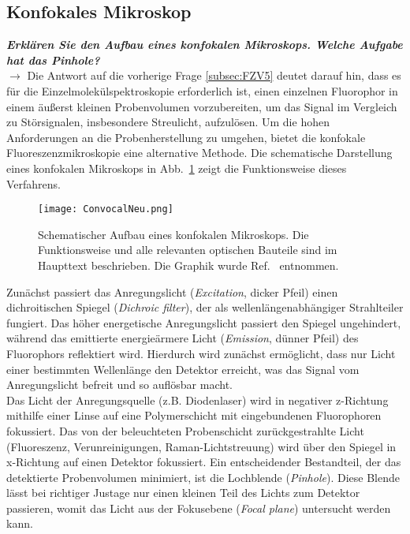 \subsection{\label{subsec:FZV6}Konfokales Mikroskop}
\textbf{\textit{Erklären Sie den Aufbau eines konfokalen Mikroskops. Welche Aufgabe hat das Pinhole?}} \\
$\rightarrow$
Die Antwort auf die vorherige Frage \ref{subsec:FZV5} deutet darauf hin, dass es für die Einzelmolekülspektroskopie 
erforderlich ist, einen einzelnen Fluorophor in einem äußerst kleinen Probenvolumen vorzubereiten, 
um das Signal im Vergleich zu Störsignalen, insbesondere Streulicht, aufzulösen. 
Um die hohen Anforderungen an die Probenherstellung zu umgehen, bietet die konfokale Fluoreszenzmikroskopie 
eine alternative Methode. Die schematische Darstellung eines konfokalen Mikroskops 
in Abb.~\ref{fig:convocal} zeigt die Funktionsweise dieses Verfahrens.
\begin{figure}[h!]
    \centering
    \texttt{[image: ConvocalNeu.png]}
    \caption{\label{fig:convocal}Schematischer Aufbau eines konfokalen Mikroskops.
    Die Funktionsweise und alle relevanten optischen Bauteile sind im Haupttext beschrieben.
    Die Graphik wurde Ref.~\cite{Prinzip} entnommen.}
\end{figure}\FloatBarrier
Zunächst passiert das Anregungslicht (\textit{Excitation}, dicker Pfeil) einen dichroitischen Spiegel 
(\textit{Dichroic filter}), der als wellenlängenabhängiger Strahlteiler fungiert. 
Das höher energetische Anregungslicht passiert den Spiegel ungehindert, während das emittierte 
energieärmere Licht (\textit{Emission}, dünner Pfeil) des Fluorophors reflektiert wird. 
Hierdurch wird zunächst ermöglicht, dass nur Licht einer bestimmten Wellenlänge den Detektor 
erreicht, was das Signal vom Anregungslicht befreit und so auflösbar macht. \\
Das Licht der Anregungsquelle (z.B. Diodenlaser) wird in negativer z-Richtung mithilfe einer Linse 
auf eine Polymerschicht mit eingebundenen Fluorophoren fokussiert. Das von der beleuchteten 
Probenschicht zurückgestrahlte Licht (Fluoreszenz, Verunreinigungen, Raman-Lichtstreuung) wird 
über den Spiegel in x-Richtung auf einen Detektor fokussiert. Ein entscheidender Bestandteil, 
der das detektierte Probenvolumen minimiert, ist die Lochblende (\textit{Pinhole}). 
Diese Blende lässt bei richtiger Justage nur einen kleinen Teil des Lichts zum Detektor passieren, 
womit das Licht aus der Fokusebene (\textit{Focal plane}) untersucht werden kann. 
